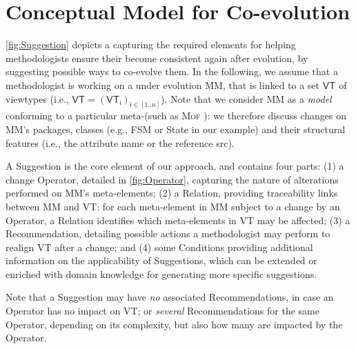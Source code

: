 \section{Conceptual Model for \Viewtype Co-evolution}
\label{sec:Suggestion}

\cref{fig:Suggestion} depicts a \metamodel capturing the
required elements for helping methodologists ensure their \viewtypes become consistent again after \metamodel evolution,
by suggesting possible ways to co-evolve them.
In the following, we assume that a methodologist is working on a \metamodel
under evolution \textsf{MM}, that is linked to a set $\mathsf{VT}$ of viewtypes
(i.e., $\mathsf{VT} = (\mathsf{VT}_\mathsf{i})_{\mathsf{i}\in [1..n]}$). Note that
we consider \textsf{MM} as a \emph{model}
conforming to a particular meta-\metamodel (such as \textsc{Mof} \cite{TR:OMG-MOF:2016}):
we therefore discuss changes on \textsf{MM}'s packages, classes (e.g., 
\textsf{FSM} or \textsf{State} in our example) and their structural features
(i.e., the attribute \textsf{name} or the reference \textsf{src}).

A \textsf{Suggestion} is the core element of our approach, and contains four 
parts: (1) a change \textsf{Operator}, detailed in \cref{fig:Operator}, 
capturing the nature of alterations performed on \textsf{MM}'s meta-elements; 
(2) a \textsf{Relation}, providing traceability links between \textsf{MM} 
and \textsf{VT}: for each meta-element in \textsf{MM} subject to a 
change by an \textsf{Operator}, a \textsf{Relation} identifies which 
meta-elements in \textsf{VT} may be affected;
(3) a \textsf{Recommendation}, detailing possible actions a methodologist 
may perform to realign \textsf{VT} after a change; and 
(4) some \textsf{Condition}s providing additional information on the applicability
of \textsf{Suggestion}s, which can be extended or enriched with domain knowledge
for generating more specific suggestions.


Note that a \textsf{Suggestion} may 
have \emph{no} associated \textsf{Recommendation}s, in case an \textsf{Operator} has no
impact on \textsf{VT}; or \emph{several} \textsf{Recommendation}s for the same 
\textsf{Operator}, depending on its complexity, but also how many \viewtypes are impacted by the \textsf{Operator}.

